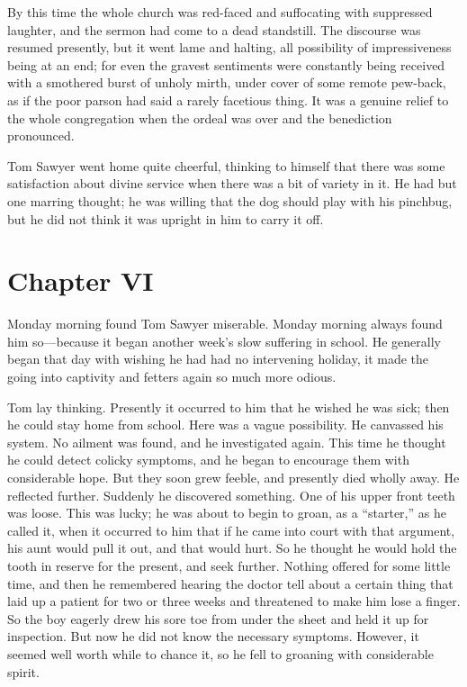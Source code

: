 \documentclass{book}
\begin{document}
By this time the whole church was red-faced and suffocating with suppressed laughter, and the sermon had come to a dead standstill. The discourse was resumed presently, but it went lame and halting, all possibility of impressiveness being at an end; for even the gravest sentiments were constantly being received with a smothered burst of unholy mirth, under cover of some remote pew-back, as if the poor parson had said a rarely facetious thing. It was a genuine relief to the whole congregation when the ordeal was over and the benediction pronounced.

Tom Sawyer went home quite cheerful, thinking to himself that there was some satisfaction about divine service when there was a bit of variety in it. He had but one marring thought; he was willing that the dog should play with his pinchbug, but he did not think it was upright in him to carry it off.

\chapter*{Chapter VI}

Monday morning found Tom Sawyer miserable. Monday morning always found him so—because it began another week’s slow suffering in school. He generally began that day with wishing he had had no intervening holiday, it made the going into captivity and fetters again so much more odious.

Tom lay thinking. Presently it occurred to him that he wished he was sick; then he could stay home from school. Here was a vague possibility. He canvassed his system. No ailment was found, and he investigated again. This time he thought he could detect colicky symptoms, and he began to encourage them with considerable hope. But they soon grew feeble, and presently died wholly away. He reflected further. Suddenly he discovered something. One of his upper front teeth was loose. This was lucky; he was about to begin to groan, as a “starter,” as he called it, when it occurred to him that if he came into court with that argument, his aunt would pull it out, and that would hurt. So he thought he would hold the tooth in reserve for the present, and seek further. Nothing offered for some little time, and then he remembered hearing the doctor tell about a certain thing that laid up a patient for two or three weeks and threatened to make him lose a finger. So the boy eagerly drew his sore toe from under the sheet and held it up for inspection. But now he did not know the necessary symptoms. However, it seemed well worth while to chance it, so he fell to groaning with considerable spirit.
\end{document}
